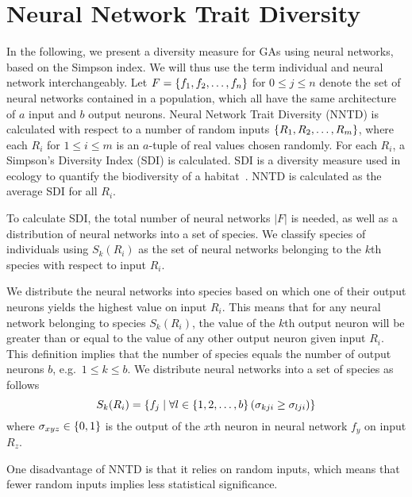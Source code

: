 \section{Neural Network Trait Diversity}
In the following, we present a diversity measure for GAs using neural networks, based on the Simpson index. We will thus use the term individual and neural network interchangeably. Let $F = \{ f_1, f_2, \dots, f_n \}$ for $0 \leq j \leq n$ denote the set of neural networks contained in a population, which all have the same architecture of $a$ input and $b$ output neurons. Neural Network Trait Diversity (NNTD) is calculated with respect to a number of random inputs $\{ R_1, R_2, \dots, R_m \}$, where each $R_i$ for $1 \leq i \leq m$ is an $a$-tuple of real values chosen randomly. For each $R_i$, a Simpson's Diversity Index (SDI) is calculated. SDI is a diversity measure used in ecology to quantify the biodiversity of a habitat~\cite{simpson1949measurement}. NNTD is calculated as the average SDI for all $R_i$.

To calculate SDI, the total number of neural networks $\lvert F \lvert$ is needed, as well as a distribution of neural networks into a set of species. We classify species of individuals using $S_k(R_i)$ as the set of neural networks belonging to the $k$th species with respect to input $R_i$.

We distribute the neural networks into species based on which one of their output neurons yields the highest value on input $R_i$. This means that for any neural network belonging to species $S_k(R_i)$, the value of the $k$th output neuron will be greater than or equal to the value of any other output neuron given input $R_i$.  This definition implies that the number of species equals the number of output neurons $b$, e.g.\ $1 \leq k \leq b$. We distribute neural networks into a set of species as follows
%
\begin{equation*}\label{eq:species}
  S_k(R_i) = \{ f_j \mid \forall l \in \{ 1, 2, \dots, b \} \left(\sigma_{kji} \geq \sigma_{lji}\right) \}
\end{equation*}
%
where $\sigma_{xyz} \in \{ 0, 1 \}$ is the output of the $x$th neuron in neural network $f_y$ on input $R_z$.

One disadvantage of NNTD is that it relies on random inputs, which means that fewer random inputs implies less statistical significance.
